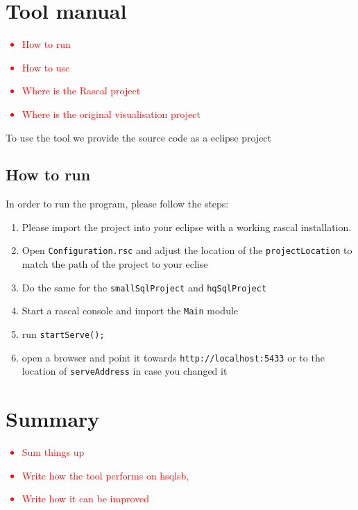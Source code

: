 \documentclass{uva-inf-article}
\newcommand\todo[1]{\textcolor{red}{#1}}
\begin{document}
\section{Tool manual}
\todo {
	\begin{itemize}
		\item{How to run}
		\item{How to use}
		\item{Where is the Rascal project}
		\item{Where is the original visualisation project }
	\end{itemize}
}

To use the tool we provide the source code as a eclipse project

\subsection{How to run}

In order to run the program, please follow the steps:

\begin{enumerate}
\item
  Please import the project into your eclipse with a working rascal
  installation.
\item
  Open \texttt{Configuration.rsc} and adjust the location of the
  \texttt{projectLocation} to match the path of the project to your
  eclise
\item
  Do the same for the \texttt{smallSqlProject} and \texttt{hqSqlProject}
\item
  Start a rascal console and import the \texttt{Main} module
\item
  run \texttt{startServe();}
\item
  open a browser and point it towards \texttt{http://localhost:5433} or
  to the location of \texttt{serveAddress} in case you changed it
\end{enumerate}


\section{Summary}
\todo {
	\begin{itemize}
		\item{Sum things up}
		\item{Write how the tool performs on hsqlsb,}
		\item{Write how it can be improved}
	\end{itemize}
}
\end{document}
